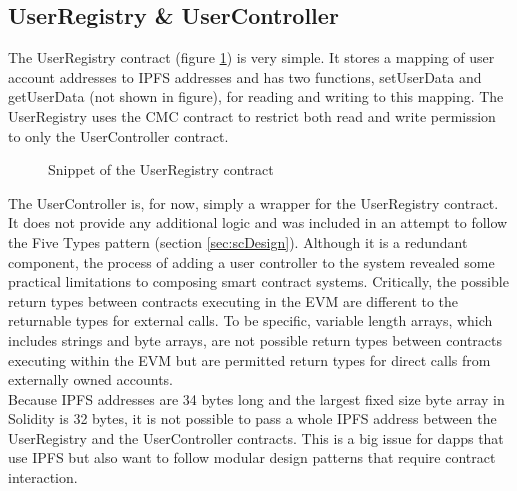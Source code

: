 \subsection{UserRegistry \& UserController}
The UserRegistry contract (figure \ref{fig:UserRegistry}) is very simple. It stores a mapping of user account addresses to IPFS addresses and has two functions, setUserData and getUserData (not shown in figure), for reading and writing to this mapping. The UserRegistry uses the CMC contract to restrict both read and write permission to only the UserController contract. \\

\begin{figure}
\centering
{}
\decoRule
\caption[UserRegistry Contract Snippet]{Snippet of the UserRegistry contract}
\label{fig:UserRegistry}
\end{figure}

The UserController is, for now, simply a wrapper for the UserRegistry contract. It does not provide any additional logic and was included in an attempt to follow the Five Types pattern (section \ref{sec:scDesign}). Although it is a redundant component, the process of adding a user controller to the system revealed some practical limitations to composing smart contract systems. Critically, the possible return types between contracts executing in the EVM are different to the returnable types for external calls. To be specific, variable length arrays, which includes strings and byte arrays, are not possible return types between contracts executing within the EVM but are permitted return types for direct calls from externally owned accounts. \\

Because IPFS addresses are 34 bytes long and the largest fixed size byte array in Solidity is 32 bytes, it is not possible to pass a whole IPFS address between the UserRegistry and the UserController contracts. This is a big issue for dapps that use IPFS but also want to follow modular design patterns that require contract interaction. \\

